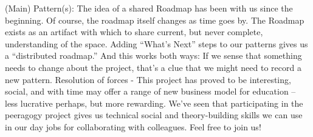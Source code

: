 (Main) Pattern(s):
The idea of a shared Roadmap has been with us since the beginning.  Of course, the roadmap itself changes as time goes by.  The Roadmap  exists as an artifact with which to share current, but never complete,  understanding of the space. Adding “What’s Next” steps to our patterns gives us a “distributed  roadmap.” And this works both ways: If we sense that something needs to  change about the project, that’s a clue that we might need to record a  new pattern.
Resolution of forces -  
This project has proved to be interesting, social, and with time may offer a range of new business model for education -- less lucrative perhaps, but more rewarding.  We've seen that participating in the peeragogy project gives us technical social and theory-building skills we can use in our day jobs for collaborating with colleagues.   Feel free to join us!


